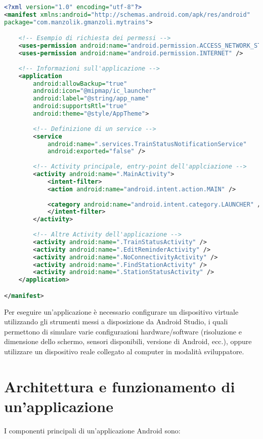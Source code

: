\begin{lstlisting}[language=XML, caption=Esempiod di \texttt{AndroidManifest.xml}]
<?xml version="1.0" encoding="utf-8"?>
<manifest xmlns:android="http://schemas.android.com/apk/res/android"
package="com.manzolik.gmanzoli.mytrains">

	<!-- Esempio di richiesta dei permessi -->
	<uses-permission android:name="android.permission.ACCESS_NETWORK_STATE" />
	<uses-permission android:name="android.permission.INTERNET" />
	
	<!-- Informazioni sull'applicazione -->
	<application
		android:allowBackup="true"
		android:icon="@mipmap/ic_launcher"
		android:label="@string/app_name"
		android:supportsRtl="true"
		android:theme="@style/AppTheme">
		
		<!-- Definizione di un service -->
		<service
			android:name=".services.TrainStatusNotificationService"
			android:exported="false" />
	
		<!-- Activity principale, entry-point dell'applciazione -->
		<activity android:name=".MainActivity">
			<intent-filter>
			<action android:name="android.intent.action.MAIN" />
			
			<category android:name="android.intent.category.LAUNCHER" />
			</intent-filter>
		</activity>
		
		<!-- Altre Activity dell'applicazione -->
		<activity android:name=".TrainStatusActivity" />
		<activity android:name=".EditReminderActivity" />
		<activity android:name=".NoConnectivityActivity" />
		<activity android:name=".FindStationActivity" />
		<activity android:name=".StationStatusActivity" />
	</application>

</manifest>
\end{lstlisting}

Per eseguire un'applicazione è necessario configurare un dispositivo
virtuale utilizzando gli strumenti messi a disposizione da Android
Studio, i quali permettono di simulare varie configurazioni
hardware/software (risoluzione e dimensione dello schermo, sensori
disponibili, versione di Android, ecc.), oppure utilizzare un
dispositivo reale collegato al computer in modalità sviluppatore.

\section{Architettura e funzionamento di un'applicazione}\label{architettura-e-funzionamento-di-unapplicazione}

I componenti principali di un'applicazione Android sono:

